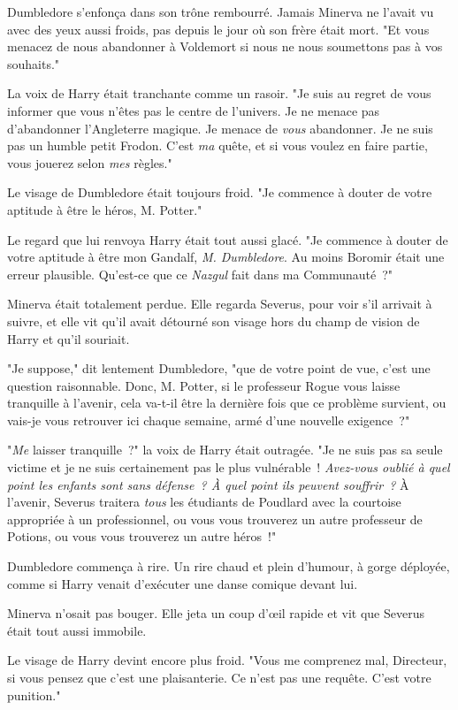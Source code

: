 Dumbledore s'enfonça dans son trône rembourré. Jamais Minerva ne l'avait vu avec des yeux aussi froids, pas depuis le jour où son frère était mort. "Et vous menacez de nous abandonner à Voldemort si nous ne nous soumettons pas à vos souhaits."

La voix de Harry était tranchante comme un rasoir. "Je suis au regret de vous informer que vous n'êtes pas le centre de l'univers. Je ne menace pas d'abandonner l'Angleterre magique. Je menace de \emph{vous} abandonner. Je ne suis pas un humble petit Frodon. C'est \emph{ma} quête, et si vous voulez en faire partie, vous jouerez selon \emph{mes} règles."

Le visage de Dumbledore était toujours froid. "Je commence à douter de votre aptitude à être le héros, M. Potter."

Le regard que lui renvoya Harry était tout aussi glacé. "Je commence à douter de votre aptitude à être mon Gandalf, \emph{M. Dumbledore}. Au moins Boromir était une erreur plausible. Qu'est-ce que ce \emph{Nazgul} fait dans ma Communauté~?"

Minerva était totalement perdue. Elle regarda Severus, pour voir s'il arrivait à suivre, et elle vit qu'il avait détourné son visage hors du champ de vision de Harry et qu'il souriait.

"Je suppose," dit lentement Dumbledore, "que de votre point de vue, c'est une question raisonnable. Donc, M. Potter, si le professeur Rogue vous laisse tranquille à l'avenir, cela va-t-il être la dernière fois que ce problème survient, ou vais-je vous retrouver ici chaque semaine, armé d'une nouvelle exigence~?"

"\emph{Me} laisser tranquille~?" la voix de Harry était outragée. "Je ne suis pas sa seule victime et je ne suis certainement pas le plus vulnérable~! \emph{Avez-vous oublié à quel point les enfants sont sans défense~? À quel point ils peuvent souffrir~?} À l'avenir, Severus traitera \emph{tous} les étudiants de Poudlard avec la courtoise appropriée à un professionnel, ou vous vous trouverez un autre professeur de Potions, ou vous vous trouverez un autre héros~!"

Dumbledore commença à rire. Un rire chaud et plein d'humour, à gorge déployée, comme si Harry venait d'exécuter une danse comique devant lui.

Minerva n'osait pas bouger. Elle jeta un coup d'œil rapide et vit que Severus était tout aussi immobile.

Le visage de Harry devint encore plus froid. "Vous me comprenez mal, Directeur, si vous pensez que c'est une plaisanterie. Ce n'est pas une requête. C'est votre punition."

